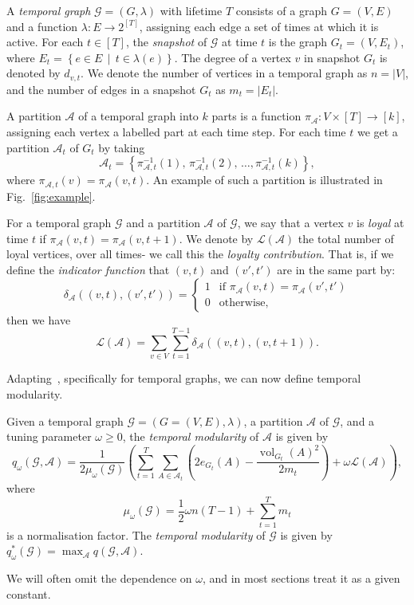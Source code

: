 \documentclass[runningheads]{llncs}
\DeclareMathOperator{\vol}{vol}
\newcommand{\cA}{\mathcal{A}}
\newcommand{\cG}{\mathcal{G}}
\newcommand{\loy}{\mathcal{L}}
\begin{document}
    A \emph{temporal graph} $\cG = (G, \lambda)$ with lifetime $T$ consists of a graph $G = (V,E)$ and a function $\lambda: E \to 2^{[T]}$, assigning each edge a set of times at which it is active. For each $t \in [T]$, the \emph{snapshot} of $\cG$ at time $t$ is the graph $G_t = (V,E_t)$, where $E_t = \left\{e \in E \,\middle|\, t \in \lambda(e)\right\}$. The degree of a vertex $v$ in snapshot $G_t$ is denoted by $d_{v,t}$. We denote the number of vertices in a temporal graph as $n = |V|$, and the number of edges in a snapshot $G_t$ as $m_t = |E_t|$.

    
    A partition $\cA$ of a temporal graph into $k$ parts is a function $\pi_\cA: V \times [T] \to [k]$, assigning each vertex a labelled part at each time step. For each time $t$ we get a partition $\cA_t$ of $G_t$ by taking
    $$\cA_t = \left\{\pi_{\cA,t}^{-1}(1),\, \pi_{\cA,t}^{-1}(2),\,\ldots,\pi_{\cA,t}^{-1}(k)\right\},$$
    where $\pi_{\cA,t}(v) = \pi_\cA(v,t)$.  An example of such a partition is illustrated in Fig.~\ref{fig:example}.



   For a temporal graph $\cG$ and a partition $\cA$ of $\cG$, we say that a vertex $v$ is \emph{loyal} at time $t$ if $\pi_\cA(v,t) = \pi_\cA(v,t+1)$. We denote by $\loy(\cA)$ the total number of loyal vertices, over all times- we call this the \emph{loyalty contribution}. That is, if we define the \emph{indicator function} that $(v,t)$ and $(v',t')$ are in the same part by:
    $$\delta_\cA((v,t),(v',t')) = \begin{cases}
        1 &\text{if }\pi_\cA(v,t) = \pi_\cA(v',t')\\
        0 &\text{otherwise,}
    \end{cases}$$
    then we have
    $$\loy(\cA) = \sum_{v \in V} \sum_{t=1}^{T-1} \delta_\cA((v,t),(v,t+1)).$$

Adapting~\cite{mucha2010community}, specifically for temporal graphs, we can now define temporal modularity.

\begin{definition}
    Given a temporal graph $\cG = (G = (V,E),\lambda)$, a partition $\cA$ of $\cG$, and a tuning parameter $\omega \geq 0$, the \emph{temporal modularity} of $\cA$ is given by
    \begin{equation}\label{eq.defn_MRMPO}
        q_\omega(\cG, \cA) = \frac{1}{2\mu_\omega(\cG)} \left(\sum_{t=1}^T \sum_{A \in \cA_t} \left( 2e_{G_t}(A) - \frac{\vol_{G_t}(A)^2}{2m_t}\right) + \omega \loy(\cA)\right),
    \end{equation}
    where
    $$\mu_\omega(\cG) = \frac{1}{2}\omega n(T-1) + \sum_{t=1}^T m_t$$
    is a normalisation factor. The \emph{temporal modularity} of $\cG$ is given by $q^*_\omega(\cG) = \max_{\cA} q(\cG,\cA)$. 
\end{definition}
 We will often omit the dependence on $\omega$, and in most sections treat it as a given constant.
\end{document}
